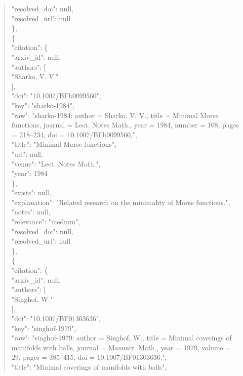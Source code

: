 \documentclass[11pt]{article}
\begin{document}
\begin{quote}
      "resolved\_doi": null,\\
      "resolved\_url": null\\
    \},\\
    \{\\
      "citation": \{\\
        "arxiv\_id": null,\\
        "authors": [\\
          "Sharko, V. V."\\
        ],\\
        "doi": "10.1007/BFb0099560",\\
        "key": "sharko-1984",\\
        "raw": "sharko-1984: author = Sharko, V. V., title = Minimal Morse functions, journal = Lect. Notes Math., year = 1984, number = 108, pages = 218--234, doi = 10.1007/BFb0099560,",\\
        "title": "Minimal Morse functions",\\
        "url": null,\\
        "venue": "Lect. Notes Math.",\\
        "year": 1984\\
      \},\\
      "exists": null,\\
      "explanation": "Related research on the minimality of Morse functions.",\\
      "notes": null,\\
      "relevance": "medium",\\
      "resolved\_doi": null,\\
      "resolved\_url": null\\
    \},\\
    \{\\
      "citation": \{\\
        "arxiv\_id": null,\\
        "authors": [\\
          "Singhof, W."\\
        ],\\
        "doi": "10.1007/BF01303636",\\
        "key": "singhof-1979",\\
        "raw": "singhof-1979: author = Singhof, W., title = Minimal coverings of manifolds with balls, journal = Manuscr. Math., year = 1979, volume = 29, pages = 385--415, doi = 10.1007/BF01303636,",\\
        "title": "Minimal coverings of manifolds with balls",\\

\end{quote}
\end{document}
